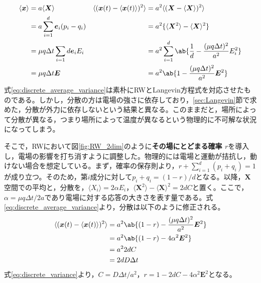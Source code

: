 \documentclass[autodetect-engine,dvi=dvipdfmx,a4paper,ja=standard,oneside,openany,11pt,draft]{bxjsbook}
\begin{document}
\begin{equation}
  \begin{aligned}
    \langle\bm{x}\rangle & =a\langle\bm{X}\rangle                    & \langle(\bm{x}(t)-\langle\bm{x}(t)\rangle)^2\rangle & =a^2\langle(\bm{X}-\langle\bm{X}\rangle)^2\rangle                        \\
                         & =a\sum_{i=1}^{d}\bm{e}_i(p_i-q_i)         &                                                     & =a^2\{\langle\bm{X}^2\rangle-\langle\bm{X}\rangle^2\}                    \\
                         & =\mu q \Delta t\sum_{i=1}{d} \bm{e}_i E_i &                                                     & =a^2\sum_{i=1}^{d}\ab\{\frac{1}{d}-\frac{(\mu q \Delta t)^2}{a^2}E_i^2\} \\
                         & =\mu q \Delta t\bm{E}                     &                                                     & =a^2\ab\{1-\frac{(\mu q \Delta t)^2}{a^2}\bm{E}^2\}                      \\
  \end{aligned}
  \label{eq:discrete_average_variance}
\end{equation}
式\ref{eq:discrete_average_variance}は素朴にRWとLangevin方程式を対応させたものである。しかし，分散の方は電場の強さに依存しており，\ref{sec:Langevin}節で求めた，分散が外力に依存しないという結果と異なる。このままだと，場所によって分散が異なる，つまり場所によって温度が異なるという物理的に不可解な状況になってしまう。

そこで，RWにおいて図\ref{fig:RW_2dim}のように\textbf{その場にとどまる確率 $r$}を導入し，電場の影響を打ち消すように調整した。物理的には電場と運動が拮抗し，動けない場合を想定している。まず，確率の保存則より，$r+\sum_{i=1}^{d}(p_i+q_i) =1$が成り立つ。そのため，第$i$成分に対して$p_i+q_i=(1-r)/d$となる。以降，$\bm{X}$空間での平均と，分散を，$\langle X_i\rangle=2\alpha E_i$，$\langle\bm{X}^2\rangle-\langle\bm{X}\rangle^2=2dC$と置く。ここで，$\alpha=\mu q\Delta t/2a$であり電場に対する応答の大きさを表す量である。式\ref{eq:discrete_average_variance}より，分散は以下のように修正される。
\begin{equation}
  \begin{split}
    \langle(\bm{x}(t)-\langle\bm{x}(t)\rangle)^2\rangle & =a^2\ab\{(1-r)-\frac{(\mu q \Delta t)^2}{a^2}\bm{E}^2\} \\
                                                        & =a^2\ab\{(1-r)-4\alpha^2\bm{E}^2\}                      \\
                                                        & =a^2 2dC                                                \\
                                                        & =2dD\Delta t
  \end{split}
  \label{eq:discrete_variance}
\end{equation}
式\ref{eq:discrete_variance}より，$C=D\Delta t/a^2$，$r=1-2dC-4\alpha^2\bm{E}^2$となる。
\end{document}
